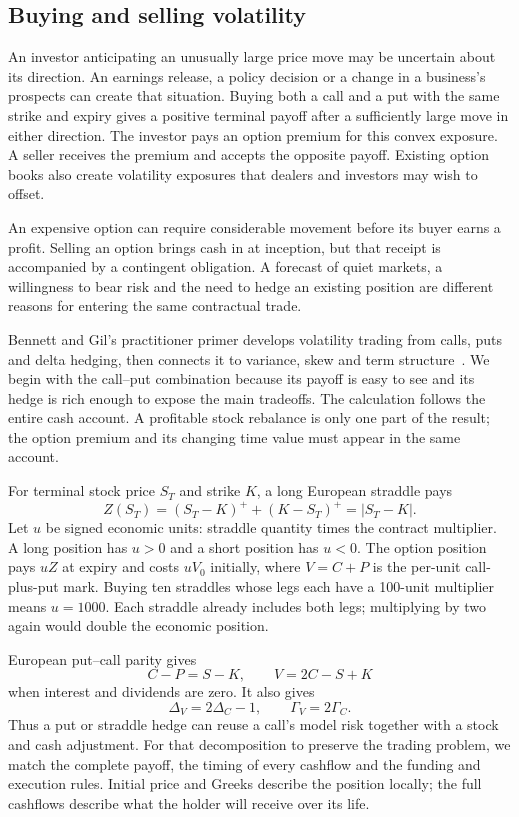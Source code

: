 \documentclass[8pt]{strategynet-journal}
\begin{document}
\begin{SNcolumns}
\section{Buying and selling volatility}
An investor anticipating an unusually large price move may be uncertain about
its direction. An earnings release, a policy decision or a change in a
business's prospects can create that situation. Buying both a call and a put
with the same strike and expiry gives a positive terminal payoff after a
sufficiently large move in either direction. The investor pays an option
premium for this convex exposure. A seller receives the premium and accepts
the opposite payoff. Existing option books also create volatility exposures
that dealers and investors may wish to offset.

An expensive option can require considerable movement before
its buyer earns a profit. Selling an option brings cash in at inception, but
that receipt is accompanied by a contingent obligation. A forecast of quiet
markets, a willingness to bear risk and the need to hedge an existing position
are different reasons for entering the same contractual trade.

Bennett and Gil's practitioner primer develops volatility trading from calls,
puts and delta hedging, then connects it to variance, skew and term
structure~\cite{bennettgil}. We begin with the call--put combination because
its payoff is easy to see and its hedge is rich enough to expose the main
tradeoffs. The calculation follows the entire cash account. A profitable stock
rebalance is only one part of the result; the option premium and its changing
time value must appear in the same account.

For terminal stock price $S_T $ and strike $K $, a long European straddle pays
\begin{equation}
 Z(S_T)=(S_T-K)^++(K-S_T)^+=|S_T-K|.
 \label{eq:payoff}
\end{equation}
Let $u $ be signed economic units: straddle quantity times the contract
multiplier. A long position has $u>0$ and a short position has $u<0$. The option
position pays $uZ $ at expiry and costs $uV_0$ initially, where $V=C+P $ is the
per-unit call-plus-put mark. Buying ten straddles whose legs each have a 100-unit
multiplier means $u=1000$. Each straddle already includes both legs; multiplying
by two again would double the economic position.

European put--call parity gives
\[
 C-P=S-K,\qquad V=2C-S+K
\]
when interest and dividends are zero. It also gives
\[
 \Delta_V=2\Delta_C-1,\qquad \Gamma_V=2\Gamma_C.
\]
Thus a put or straddle hedge can reuse a call's model risk together with a
stock and cash adjustment. For that decomposition to preserve the trading problem, we match the complete
payoff, the timing of every cashflow and the funding and execution rules.
Initial price and Greeks describe the position locally; the full cashflows
describe what the holder will receive over its life.


\end{SNcolumns}
\end{document}
